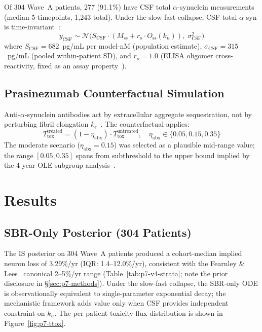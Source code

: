 Of 304 Wave~A patients, 277 (91.1\%) have CSF total $\alpha$-synuclein measurements (median 5 timepoints, 1,243 total). Under the slow-fast collapse, CSF total $\alpha$-syn is time-invariant~\cite{mollenhauer2017csf}:
\begin{equation}
y_\text{CSF} \sim \mathcal{N}\bigl(S_\text{CSF} \cdot (M_\text{ss} + r_o \cdot O_\text{ss}(k_n)),\; \sigma_\text{CSF}^2\bigr)
\label{eq:p7-csf-obs}
\end{equation}
where $S_\text{CSF} = 682$~pg/mL per model-nM (population estimate), $\sigma_\text{CSF} = 315$~pg/mL (pooled within-patient SD), and $r_o = 1.0$ (ELISA oligomer cross-reactivity, fixed as an assay property~\cite{petricca2022,koehler2008}).

\subsection{Prasinezumab Counterfactual Simulation}

Anti-$\alpha$-synuclein antibodies act by extracellular aggregate sequestration, not by perturbing fibril elongation $k_e$~\cite{jankovic2018}. The counterfactual applies:
\begin{equation}
T_\text{tox}^\text{treated} = (1 - \eta_\text{abx}) \cdot T_\text{tox}^\text{untreated}, \quad \eta_\text{abx} \in \{0.05, 0.15, 0.35\}
\label{eq:p7-counterfactual}
\end{equation}
The moderate scenario ($\eta_\text{abx} = 0.15$) was selected as a plausible mid-range value; the range $[0.05, 0.35]$ spans from subthreshold to the upper bound implied by the 4-year OLE subgroup analysis~\cite{pagano2024}.


\section{Results}
\label{sec:p7-results}

\subsection{SBR-Only Posterior (304 Patients)}

The IS posterior on 304 Wave~A patients produced a cohort-median implied neuron loss of 3.29\%/yr (IQR: 1.4--12.0\%/yr), consistent with the Fearnley \& Lees~\cite{fearnley1991} canonical 2--5\%/yr range (Table~\ref{tab:p7-v4-strata}; note the prior disclosure in \S\ref{sec:p7-methods}). Under the slow-fast collapse, the SBR-only ODE is observationally equivalent to single-parameter exponential decay; the mechanistic framework adds value only when CSF provides independent constraint on $k_n$. The per-patient toxicity flux distribution is shown in Figure~\ref{fig:p7-ttox}.


